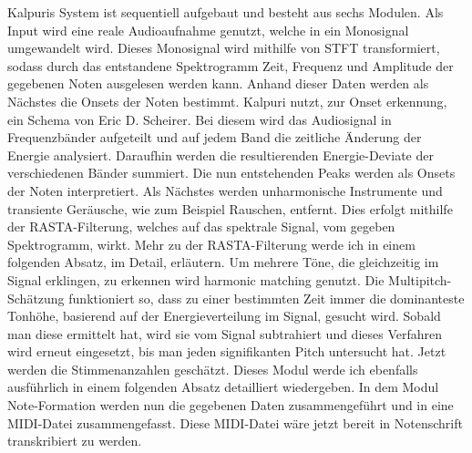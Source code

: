 Kalpuris System ist sequentiell aufgebaut und besteht aus sechs Modulen.
Als Input wird eine reale Audioaufnahme genutzt, welche in ein Monosignal umgewandelt wird.
Dieses Monosignal wird mithilfe von STFT transformiert, sodass durch das entstandene Spektrogramm Zeit,
Frequenz und Amplitude der gegebenen Noten ausgelesen werden kann.
Anhand dieser Daten werden als Nächstes die Onsets der Noten bestimmt.
Kalpuri nutzt, zur Onset erkennung, ein Schema von Eric D. Scheirer.
\cite{scheirer1998tempo}
Bei diesem wird das Audiosignal in Frequenzbänder aufgeteilt und
auf jedem Band die zeitliche Änderung der Energie analysiert.
Daraufhin werden die resultierenden Energie-Deviate der verschiedenen Bänder summiert.
Die nun entstehenden Peaks werden als Onsets der Noten interpretiert.
Als Nächstes werden unharmonische Instrumente und transiente Geräusche, wie zum Beispiel Rauschen, entfernt.
Dies erfolgt mithilfe der RASTA-Filterung, welches auf das spektrale Signal, vom gegeben Spektrogramm, wirkt.
Mehr zu der RASTA-Filterung werde ich in einem folgenden Absatz, im Detail, erläutern.
Um mehrere Töne, die gleichzeitig im Signal erklingen, zu erkennen wird harmonic matching genutzt.
Die Multipitch-Schätzung funktioniert so, dass zu einer bestimmten Zeit immer die dominanteste Tonhöhe,
basierend auf der Energieverteilung im Signal, gesucht wird.
Sobald man diese ermittelt hat, wird sie vom Signal subtrahiert und dieses Verfahren wird erneut eingesetzt,
bis man jeden signifikanten Pitch untersucht hat.
Jetzt werden die Stimmenanzahlen geschätzt.
Dieses Modul werde ich ebenfalls ausführlich in einem folgenden Absatz detailliert wiedergeben.
In dem Modul Note-Formation werden nun die gegebenen Daten zusammengeführt und in eine MIDI-Datei zusammengefasst.
Diese MIDI-Datei wäre jetzt bereit in Notenschrift transkribiert zu werden.

